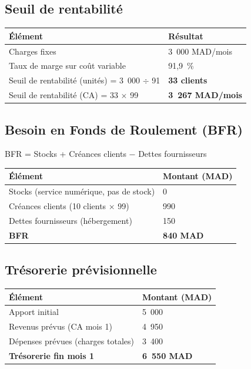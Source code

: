 \documentclass[12pt,a4paper]{report}
\newcommand{\hdr}[1]{\cellcolor{gray!15}\textbf{#1}}
\newcommand{\rowA}{\rowcolor{gray!8}}
\begin{document}
\subsection{Seuil de rentabilité}

\begin{table}[H]
\centering
\begin{tabular}{p{7cm}p{4cm}}
\toprule
\hdr{Élément} & \hdr{Résultat} \\
\midrule
Charges fixes & 3~000 MAD/mois \\
\rowA Taux de marge sur coût variable & 91,9~\% \\
Seuil de rentabilité (unités) = 3~000 $\div$ 91 & \textbf{33 clients} \\
\rowA Seuil de rentabilité (CA) = 33 $\times$ 99 & \textbf{3~267 MAD/mois} \\
\bottomrule
\end{tabular}
\end{table}

\subsection{Besoin en Fonds de Roulement (BFR)}

BFR = Stocks + Créances clients $-$ Dettes fournisseurs

\begin{table}[H]
\centering
\begin{tabular}{p{6cm}p{4cm}}
\toprule
\hdr{Élément} & \hdr{Montant (MAD)} \\
\midrule
Stocks (service numérique, pas de stock) & 0 \\
\rowA Créances clients (10 clients $\times$ 99) & 990 \\
Dettes fournisseurs (hébergement) & 150 \\
\midrule
\rowcolor{gray!12}\textbf{BFR} & \textbf{840 MAD} \\
\bottomrule
\end{tabular}
\end{table}

\subsection{Trésorerie prévisionnelle}

\begin{table}[H]
\centering
\begin{tabular}{p{6cm}p{4cm}}
\toprule
\hdr{Élément} & \hdr{Montant (MAD)} \\
\midrule
Apport initial & 5~000 \\
\rowA Revenus prévus (CA mois 1) & 4~950 \\
Dépenses prévues (charges totales) & 3~400 \\
\midrule
\rowcolor{gray!12}\textbf{Trésorerie fin mois 1} & \textbf{6~550 MAD} \\
\bottomrule
\end{tabular}
\end{table}
\end{document}
